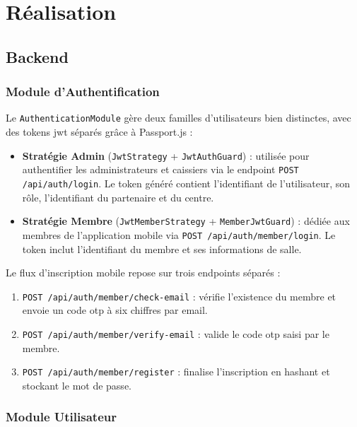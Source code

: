 ﻿\documentclass[../main.tex]{subfiles}
\begin{document}
\section{R\'{e}alisation}

\subsection{Backend}

\subsubsection{Module d'Authentification}

Le \texttt{AuthenticationModule} g\`{e}re deux familles d'utilisateurs bien distinctes, avec des tokens \acrshort{jwt} \cite{jwt_rfc7519} s\'{e}par\'{e}s gr\^{a}ce \`{a} Passport.js \cite{passport} :

\begin{itemize}
  \item \textbf{Strat\'{e}gie Admin} (\texttt{JwtStrategy} + \texttt{JwtAuthGuard}) : utilis\'{e}e pour authentifier les administrateurs et caissiers via le endpoint \texttt{POST /api/auth/login}. Le token g\'{e}n\'{e}r\'{e} contient l'identifiant de l'utilisateur, son r\^{o}le, l'identifiant du partenaire et du centre.
  \item \textbf{Strat\'{e}gie Membre} (\texttt{JwtMemberStrategy} + \texttt{MemberJwtGuard}) : d\'{e}di\'{e}e aux membres de l'application mobile via \texttt{POST /api/auth/member/login}. Le token inclut l'identifiant du membre et ses informations de salle.
\end{itemize}

Le flux d'inscription mobile repose sur trois endpoints s\'{e}par\'{e}s :
\begin{enumerate}
  \item \texttt{POST /api/auth/member/check-email} : v\'{e}rifie l'existence du membre et envoie un code \acrshort{otp} \`{a} six chiffres par email.
  \item \texttt{POST /api/auth/member/verify-email} : valide le code \acrshort{otp} saisi par le membre.
  \item \texttt{POST /api/auth/member/register} : finalise l'inscription en hashant et stockant le mot de passe.
\end{enumerate}

\subsubsection{Module Utilisateur}
\end{document}
